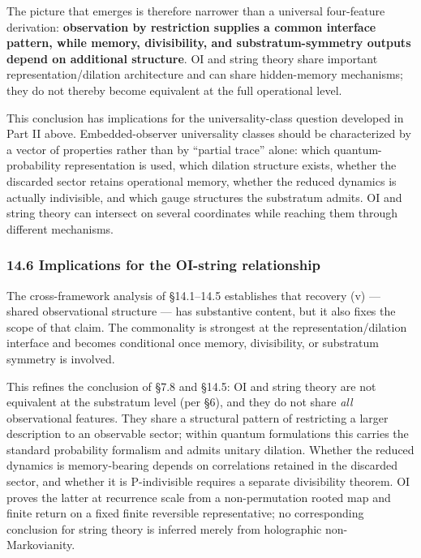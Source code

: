 \documentclass[
]{article}
\begin{document}
The picture that emerges is therefore narrower than a universal
four-feature derivation: \textbf{observation by restriction supplies a
common interface pattern, while memory, divisibility, and
substratum-symmetry outputs depend on additional structure}. OI and
string theory share important representation/dilation architecture and
can share hidden-memory mechanisms; they do not thereby become
equivalent at the full operational level.

This conclusion has implications for the universality-class question
developed in Part II above. Embedded-observer universality classes
should be characterized by a vector of properties rather than by
``partial trace'' alone: which quantum-probability representation is
used, which dilation structure exists, whether the discarded sector
retains operational memory, whether the reduced dynamics is actually
indivisible, and which gauge structures the substratum admits. OI and
string theory can intersect on several coordinates while reaching them
through different mechanisms.

\hypertarget{implications-for-the-oi-string-relationship}{%
\subsubsection{14.6 Implications for the OI-string
relationship}\label{implications-for-the-oi-string-relationship}}

The cross-framework analysis of §14.1--14.5 establishes that recovery
(v) --- shared observational structure --- has substantive content, but
it also fixes the scope of that claim. The commonality is strongest at
the representation/dilation interface and becomes conditional once
memory, divisibility, or substratum symmetry is involved.

This refines the conclusion of §7.8 and §14.5: OI and string theory are
not equivalent at the substratum level (per §6), and they do not share
\emph{all} observational features. They share a structural pattern of
restricting a larger description to an observable sector; within quantum
formulations this carries the standard probability formalism and admits
unitary dilation. Whether the reduced dynamics is memory-bearing depends
on correlations retained in the discarded sector, and whether it is
P-indivisible requires a separate divisibility theorem. OI proves the
latter at recurrence scale from a non-permutation rooted map and finite
return on a fixed finite reversible representative; no corresponding
conclusion for string theory is inferred merely from holographic
non-Markovianity.
\end{document}
